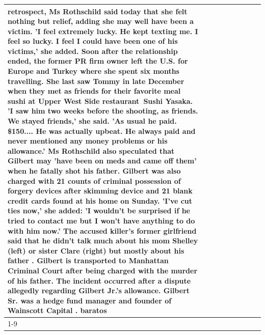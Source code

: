 \begin{table}[H]
\begin{tabular}{lllrlllll}
retrospect, Ms Rothschild said today that she felt nothing but relief, adding she may well have been a victim. 'I feel extremely lucky. He kept texting me. I feel so lucky. I feel I could have been one of his victims,' she added. Soon after the relationship ended, the former PR firm owner left the U.S. for Europe and Turkey where she spent six months  travelling. She last saw Tommy in late December when they met as friends for their favorite meal sushi at Upper West Side restaurant Sushi Yasaka. 'I saw him two weeks before the shooting, as friends. We stayed friends,' she said. 'As usual he paid. \$150.... He was actually upbeat. He always paid and never mentioned any money problems or his allowance.' Ms Rothschild also speculated that Gilbert may 'have been on meds and came off them' when he fatally shot his father. Gilbert was also charged with 21 counts of criminal possession of forgery devices after skimming device and 21 blank credit cards found at his home on Sunday. 'I've cut ties now,' she added: 'I wouldn’t be surprised if he tried to contact me but I won’t have anything to do with him now.' The accused killer's former girlfriend said that he didn't talk much about his mom Shelley (left) or sister Clare (right) but mostly about his father . Gilbert is transported to Manhattan Criminal Court  after being charged with the murder of his father. The incident occurred after a dispute allegedly regarding Gilbert Jr.'s allowance. Gilbert Sr. was a hedge fund manager and founder of Wainscott Capital . baratos \\
\cline{1-9}

\end{tabular}
\end{table}
